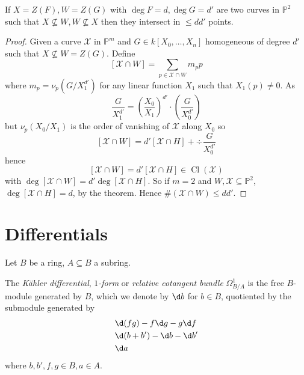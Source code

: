 \documentclass[a4paper]{article}
\DeclareMathOperator{\Cl}{Cl}
\renewcommand*{\P}{\mathbb{P}}
\begin{document}
\begin{corollary}
  If \(X = Z(F), W = Z(G)\) with \(\deg F = d, \deg G = d'\) are two curves in \(\P^2\) such that \(X \nsubseteq W, W \nsubseteq X\) then they intersect in \(\leq dd'\) points.
\end{corollary}

\begin{proof}
  Given a curve \(\mathcal X\) in \(\P^m\) and \(G \in k[X_0, \dots, X_n]\) homogeneous of degree \(d'\) such that \(X \nsubseteq W = Z(G)\). Define
  \[
    [\mathcal X \cap W] = \sum_{p \in \mathcal X \cap W} m_p p
  \]
  where \(m_p = \nu_p(G/X_1^{d'})\) for any linear function \(X_1\) such that \(X_1(p) \neq 0\). As
  \[
    \frac{G}{X_1^{d'}} = \left( \frac{X_0}{X_1} \right)^{d'} \cdot \left( \frac{G}{X_0^{d'}} \right)
  \]
  but \(\nu_p(X_0/X_1)\) is the order of vanishing of \(\mathcal X\) along \(X_0\) so
  \[
    [\mathcal X \cap W] = d'[\mathcal X \cap H] + \div \frac{G}{X_0^{d'}}
  \]
  hence
  \[
    [\mathcal X \cap W] = d' [\mathcal X \cap H] \in \Cl(\mathcal X)
  \]
  with \(\deg [\mathcal X \cap W] = d' \deg [\mathcal X \cap H]\). So if \(m = 2\) and \(W, \mathcal X \subseteq \P^2\), \(\deg[\mathcal X \cap H] = d\), by the theorem. Hence \(\# (\mathcal X \cap W) \leq dd'\).
\end{proof}

\section{Differentials}

Let \(B\) be a ring, \(A \subseteq B\) a subring.

\begin{definition}
  The \emph{Kähler differential}, \emph{\(1\)-form} or \emph{relative cotangent bundle} \(\Omega^1_{B/A}\) is the free \(B\)-module generated by \(B\), which we denote by \(\d b\) for \(b \in B\), quotiented by the submodule generated by
  \begin{align*}
    &\d(fg) - f \d g - g \d f \\
    &\d(b + b') - \d b - \d b' \\
    &\d a
  \end{align*}
  where \(b, b', f, g \in B, a \in A\).
\end{definition}
\end{document}
